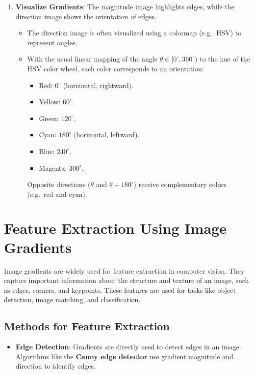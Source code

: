\begin{notechapter}
\begin{enumerate}
\begin{itemize}
                  of the intensity change at each pixel.
            \item The gradient direction $\theta$ represents the
                  orientation of the intensity change, which is
                  perpendicular to the edge.
        \end{itemize}
    \item \textbf{Visualize Gradients}:
        The magnitude image highlights edges, while the
        direction image shows the orientation of edges.
        \begin{itemize}
            \item The direction image is often visualized using a
                  colormap (e.g., HSV) to represent angles.
            \item With the usual linear mapping of the angle \( \theta \in [0^\circ, 360^\circ) \) to the hue
                  of the HSV color wheel, each color corresponds to an orientation:
                  \begin{itemize}
                      \item Red: $0^\circ$ (horizontal, rightward).
                      \item Yellow: $60^\circ$.
                      \item Green: $120^\circ$.
                      \item Cyan: $180^\circ$ (horizontal, leftward).
                      \item Blue: $240^\circ$.
                      \item Magenta: $300^\circ$.
                  \end{itemize}
                  Opposite directions (\( \theta \) and \( \theta + 180^\circ \)) receive complementary colors
                  (e.g.\ red and cyan).
        \end{itemize}
\end{enumerate}

\section{Feature Extraction Using Image Gradients}
Image gradients are widely used for feature extraction in
computer vision. They capture important information about
the structure and texture of an image, such as edges, corners,
and keypoints. These features are used for tasks like object
detection, image matching, and classification.

\subsection{Methods for Feature Extraction}
\begin{itemize}
    \item \textbf{Edge Detection}:
        Gradients are directly used to detect edges in an image.
        Algorithms like the \textbf{Canny edge detector} use
        gradient magnitude and direction to identify edges.


\end{itemize}
\end{notechapter}
